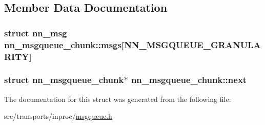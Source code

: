 \subsection{Member Data Documentation}
\subsubsection[{msgs}]{\setlength{\rightskip}{0pt plus 5cm}struct {\bf nn\+\_\+msg} nn\+\_\+msgqueue\+\_\+chunk\+::msgs\mbox{[}{\bf N\+N\+\_\+\+M\+S\+G\+Q\+U\+E\+U\+E\+\_\+\+G\+R\+A\+N\+U\+L\+A\+R\+I\+TY}\mbox{]}}\hypertarget{structnn__msgqueue__chunk_a69bcf939f933f7711a47618ecb936e2b}{}\label{structnn__msgqueue__chunk_a69bcf939f933f7711a47618ecb936e2b}
\subsubsection[{next}]{\setlength{\rightskip}{0pt plus 5cm}struct {\bf nn\+\_\+msgqueue\+\_\+chunk}$\ast$ nn\+\_\+msgqueue\+\_\+chunk\+::next}\hypertarget{structnn__msgqueue__chunk_aa539574be0f7c15d30f2c0920b3586a1}{}\label{structnn__msgqueue__chunk_aa539574be0f7c15d30f2c0920b3586a1}


The documentation for this struct was generated from the following file\+:\begin{DoxyCompactItemize}
\item 
src/transports/inproc/\hyperlink{msgqueue_8h}{msgqueue.\+h}\end{DoxyCompactItemize}
